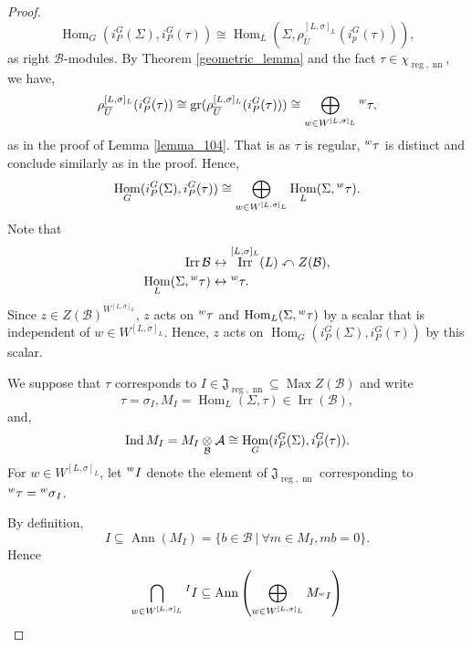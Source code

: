 \documentclass[8pt]{article}
\DeclareMathOperator{\Ind}{Ind}
\DeclareMathOperator{\Hom}{Hom}
\DeclareMathOperator{\gr}{gr}
\DeclareMathOperator{\Irr}{Irr}
\DeclareMathOperator{\nn}{nn}
\DeclareMathOperator{\reg}{reg}
\DeclareMathOperator{\Max}{Max}
\DeclareMathOperator{\Ann}{Ann}
\newcommand{\sep}[0]{\:|\:}
\newcommand{\cA}{\mathcal{A}}
\newcommand{\cB}{\mathcal{B}}
\newcommand{\tens}[1]{%
  \mathbin{\mathop{\otimes}\displaylimits_{#1}}%
}
\begin{document}
\begin{proof}
  \begin{equation*}
    \Hom_G(i_P^G(\Sigma),i_P^G(\tau))\cong \Hom_L(\Sigma,\rho_{\overline{U}}^{[L,\sigma]_L}(i_p^G(\tau))),
  \end{equation*}
  as right $\cB$-modules. By Theorem \ref{geometric_lemma} and the fact $\tau\in\chi_{\reg,\nn}$, we have,
  \begin{equation*}
    \rho_{\overline{U}}^{[L,\sigma]_L}(i_P^G(\tau))\cong\gr(\rho_{\overline{U}}^{[L,\sigma]_L}(i_P^G(\tau)))\cong\bigoplus_{w\in W^{[L,\sigma]_L}}\prescript{w}{}{\tau},
  \end{equation*}
  as in the proof of Lemma \ref{lemma_104}. That is as $\tau$ is regular, $\prescript{w}{}{\tau}$ is distinct and conclude similarly as in the proof. Hence, 
  \begin{equation*}
    \Hom_G(i_P^G(\Sigma),i_P^G(\tau)) \cong \bigoplus_{w\in W^{[L,\sigma]_L}}\Hom_L(\Sigma,\prescript{w}{}{\tau}).
  \end{equation*}
  Note that 
  \begin{align*}
    \Irr\cB&\leftrightarrow\Irr^{[L,\sigma]_L}(L)\curvearrowleft Z(\cB),\\
    \Hom_L(\Sigma,\prescript{w}{}{\tau})&\leftrightarrow\prescript{w}{}{\tau}.
  \end{align*}
  Since $z\in Z(\cB)^{W^{[L,\sigma]_L}}$, $z$ acts on $\prescript{w}{}{\tau}$ and $\Hom_L(\Sigma,\prescript{w}{}{\tau})$ by a scalar that is independent of $w\in W^{[L,\sigma]_L}$.
  Hence, $z$ acts on $\Hom_G(i_P^G(\Sigma),i_P^G(\tau))$ by this scalar.
  \par We suppose that $\tau$ corresponds to $I\in\mathfrak{J}_{\reg,\nn}\subseteq\Max Z(\cB)$ and write
  \begin{equation*}
    \tau=\sigma_I, M_I = \Hom_L(\Sigma,\tau)\in\Irr(\cB),
  \end{equation*}
  and,
  \begin{equation*}
    \Ind  M_I = M_I\tens{\cB}\cA\cong\Hom_G(i_P^G(\Sigma),i_P^G(\tau)).
  \end{equation*}
  For $w\in W^{[L,\sigma]_L}$, let $\prescript{w}{}{I}$ denote the element of $\mathfrak{J}_{\reg,\nn}$ corresponding to $\prescript{w}{}{\tau}=\prescript{w}{}{\sigma}_I$.
  \par By definition,
  \begin{equation*}
    I\subseteq\Ann(M_I)=\{b\in\cB\sep \forall m\in M_I, mb=0\}.
  \end{equation*}
  Hence 
  \begin{align*}
    \bigcap_{w\in W^{[L,\sigma]_L}}\prescript{I}{}{I}&\subseteq\Ann\left(\bigoplus_{w\in W^{[L,\sigma]_L}}M_{\prescript{w}{}{I}}\right)\\

\end{align*}
\end{proof}
\end{document}
